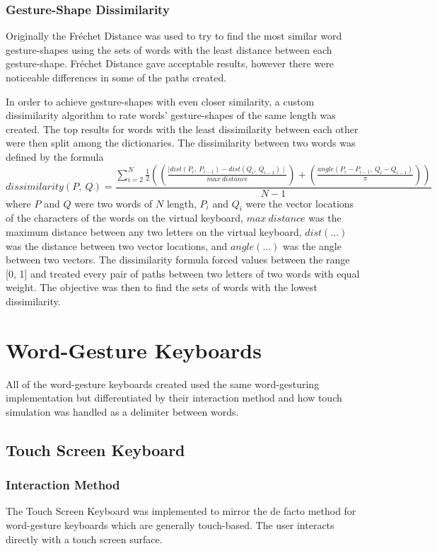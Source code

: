 \subsubsection {Gesture-Shape Dissimilarity}
Originally the Fr\'echet Distance was used to try to find the most similar word gesture-shapes using the sets of words with the least distance between each gesture-shape. Fr\'echet Distance gave acceptable results, however there were noticeable differences in some of the paths created.

In order to achieve gesture-shapes with even closer similarity, a custom dissimilarity algorithm to rate words' gesture-shapes of the same length was created. The top results for words with the least dissimilarity between each other were then split among the dictionaries. The dissimilarity between two words was defined by the formula
\begin{equation}
dissimilarity(P,\ Q) = \frac{\sum\limits_{i = 2}^{N} \frac{1}{2} \left(\left(\frac{\mid dist(P_{i},\ P_{i-1}) - dist(Q_{i},\ Q_{i-1})\mid}{max\ distance}\right) + \left(\frac{angle(P_{i} - P_{i-1},\ Q_{i} - Q_{i-1})}{\pi}\right)\right)}{N - 1}
\end{equation}
where $P$ and $Q$ were two words of $N$ length, $P_i$ and $Q_i$ were the vector locations of the characters of the words on the virtual keyboard, $max\ distance$ was the maximum distance between any two letters on the virtual keyboard, $dist(...)$ was the distance between two vector locations, and $angle(...)$ was the angle between two vectors. The dissimilarity formula forced values between the range [0, 1] and treated every pair of paths between two letters of two words with equal weight. The objective was then to find the sets of words with the lowest dissimilarity.

\section{Word-Gesture Keyboards}
All of the word-gesture keyboards created used the same word-gesturing implementation but differentiated by their interaction method and how touch simulation was handled as a delimiter between words.

\subsection{Touch Screen Keyboard}
\subsubsection{Interaction Method}
The Touch Screen Keyboard was implemented to mirror the de facto method for word-gesture keyboards which are generally touch-based. The user interacts directly with a touch screen surface.

